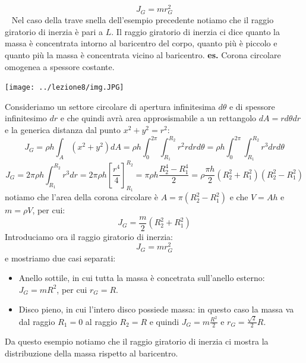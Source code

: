 \[
    J_G = m r_G^2
\]
\ \newline
Nel caso della trave snella dell'esempio precedente notiamo che il raggio giratorio di inerzia è pari a $L$.\newline
\newline
Il raggio giratorio di inerzia ci dice quanto la massa è concentrata intorno al baricentro del corpo, quanto più è piccolo e quanto più la massa è concentrata vicino al baricentro.
\newline
\newline
\textbf{es.} Corona circolare omogenea a spessore costante.
\begin{center}
    \texttt{[image: ../lezione8/img.JPG]}
\end{center}
Consideriamo un settore circolare di apertura infinitesima $d \theta$ e di spessore infinitesimo $d r$ e che quindi avrà area approsismabile a un rettangolo $dA = r d \theta d r$ e la generica distanza dal punto $x^2 + y^2 = r^2$:
\[
    J_G = \rho h \int_A (x^2 + y^2) dA = \rho h \int_{0}^{2\pi} \int_{R_1}^{R_2} r^2 r d r d \theta = \rho h \int_{0}^{2\pi} \int_{R_1}^{R_2} r^3 d r d \theta
\]
\[
    J_G = 2 \pi \rho h \int_{R_1}^{R_2} r^3 dr = 2 \pi \rho h \left[\frac{r^4}{4}\right]_{R_1}^{R_2} = \pi \rho h \frac{R_2^4 - R_1^4}{2} = \rho \frac{\pi h }{2} (R_2^2 + R_1^2) (R_2^2 - R_1^2)
\]
notiamo che l'area della corona circolare è $A = \pi (R_2^2 -R_1^2)$ e che $V = A h$ e $m = \rho V$, per cui:
\[
    J_G = \frac{m}{2}(R_2^2 + R_1^2)
\]
Introduciamo ora il raggio giratorio di inerzia:
\[
    J_G = m r_G^2
\]
e mostriamo due casi separati:
\begin{itemize}
    \item Anello sottile, in cui tutta la massa è concetrata sull'anello esterno: $J_G = m R^2$, per cui $r_G = R$.
    \item Disco pieno, in cui l'intero disco possiede massa: in questo caso la massa va dal raggio $R_1= 0$ al raggio $R_2 = R$ e quindi $J_G = m \frac{R^2}{2}$ e $r_G = \frac{\sqrt{2}}{2}R$.
\end{itemize}
Da questo esempio notiamo che il raggio giratorio di inerzia ci mostra la distribuzione della massa rispetto al baricentro.\newline
\newline
